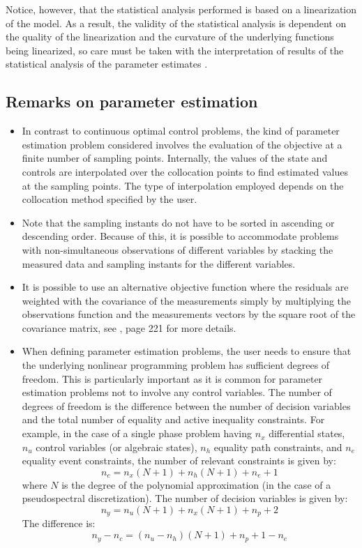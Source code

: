 \documentclass[a4paper,11pt]{report}    %
\begin{document}
Notice, however, that the statistical analysis performed is based on a linearization of the model. As a result, the validity
of the statistical analysis is dependent on the quality of the linearization and the curvature of the underlying functions being
linearized, so care must be taken with the interpretation of results of the statistical analysis of the parameter
estimates \cite{Schittkowski:02}.

\subsection{Remarks on parameter estimation}

\begin{itemize}
\item In contrast to continuous optimal control problems, the kind of parameter estimation problem considered involves 
the evaluation of the objective at a finite number of sampling points. Internally, the values of the
state and controls are interpolated over the collocation points to find estimated values at the
sampling points. The type of interpolation employed depends on the collocation method specified
by the user.  

\item Note that the sampling instants do not have to be sorted in ascending or descending order. Because
of this, it is possible to accommodate problems with non-simultaneous observations of different variables 
by stacking the measured data and sampling instants for the different variables.

\item It is possible to use an alternative objective function where the residuals are weighted with the covariance of the measurements 
simply by multiplying the observations function and the measurements vectors by
the square root of the covariance matrix, see \cite{Betts:10}, page 221 for more details.

\item When defining parameter estimation problems, the user needs to ensure
that the underlying nonlinear programming problem has sufficient degrees of freedom. This is particularly
important as it is common for parameter estimation problems not to involve any control variables. The number of degrees of freedom
is the difference between the number of decision variables and the total number of equality and active inequality constraints.
For example, in the case of a single phase problem having $n_x$ differential states, $n_u$ control variables (or algebraic states),
 $n_h$ equality path constraints, and $n_e$ equality event constraints,
the number of relevant constraints is given by:
\[
   n_c = n_x(N+1) + n_h(N+1) + n_e + 1
\]
where $N$ is the degree of the polynomial approximation (in the case of a pseudospectral discretization). 
The number of decision variables is given by:
\[
  n_y = n_u (N+1) + n_x(N+1) + n_p + 2
\]
The difference is:
\[
  n_y- n_c = (n_u-n_h) (N+1) +n_p + 1 - n_e
\]


\end{itemize}
\end{document}
